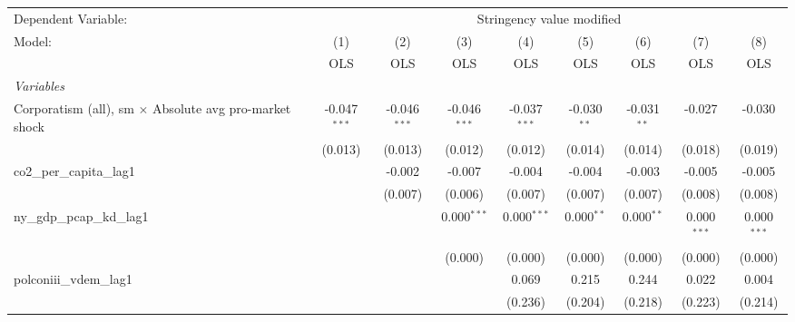 
\begingroup
\centering
\begin{tabular}{lcccccccc}
   \toprule
   Dependent Variable: & \multicolumn{8}{c}{Stringency value modified}\\
   Model:                                                        & (1)            & (2)            & (3)            & (4)            & (5)           & (6)           & (7)           & (8)\\  
                                                                 &  OLS           & OLS            & OLS            & OLS            & OLS           & OLS           & OLS           & OLS\\  
   \midrule
   \emph{Variables}\\
   Corporatism (all), sm $\times$ Absolute avg pro-market shock  & -0.047$^{***}$ & -0.046$^{***}$ & -0.046$^{***}$ & -0.037$^{***}$ & -0.030$^{**}$ & -0.031$^{**}$ & -0.027        & -0.030\\   
                                                                 & (0.013)        & (0.013)        & (0.012)        & (0.012)        & (0.014)       & (0.014)       & (0.018)       & (0.019)\\   
   co2\_per\_capita\_lag1                                        &                & -0.002         & -0.007         & -0.004         & -0.004        & -0.003        & -0.005        & -0.005\\   
                                                                 &                & (0.007)        & (0.006)        & (0.007)        & (0.007)       & (0.007)       & (0.008)       & (0.008)\\   
   ny\_gdp\_pcap\_kd\_lag1                                       &                &                & 0.000$^{***}$  & 0.000$^{***}$  & 0.000$^{**}$  & 0.000$^{**}$  & 0.000$^{***}$ & 0.000$^{***}$\\   
                                                                 &                &                & (0.000)        & (0.000)        & (0.000)       & (0.000)       & (0.000)       & (0.000)\\   
   polconiii\_vdem\_lag1                                         &                &                &                & 0.069          & 0.215         & 0.244         & 0.022         & 0.004\\   
                                                                 &                &                &                & (0.236)        & (0.204)       & (0.218)       & (0.223)       & (0.214)\\   

\end{tabular}
